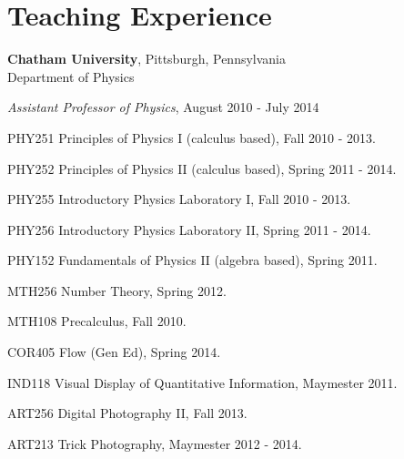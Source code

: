 \section{\sc Teaching Experience} %

{\bf Chatham University}, Pittsburgh, Pennsylvania\\
Department of Physics
\vspace{1mm}
\begin{list1}
\item[] {\em Assistant Professor of Physics}, August 2010 - July 2014
\vspace*{2mm}  
\begin{list2}
\item[\fcscore{4}] PHY251 Principles of Physics I (calculus based),  Fall 2010 - 2013.
\item[\fcscore{4}] PHY252 Principles of Physics II (calculus based),  Spring 2011 - 2014.
\item[\fcscore{4}] PHY255 Introductory Physics Laboratory I,  Fall 2010 - 2013.
\item[\fcscore{4}] PHY256 Introductory Physics Laboratory II,  Spring 2011 - 2014.
\item[\fcscore{1}] PHY152 Fundamentals of Physics II (algebra based),  Spring 2011.
\item[\fcscore{1}] MTH256 Number Theory, Spring 2012.
\item[\fcscore{1}] MTH108 Precalculus, Fall 2010.
\item[\fcscore{1}] COR405 Flow (Gen Ed), Spring 2014.
\item[\fcscore{1}] IND118 Visual Display of Quantitative Information, Maymester 2011.
\item[\fcscore{1}] ART256 Digital Photography II, Fall 2013.
\item[\fcscore{3}] ART213 Trick Photography, Maymester 2012 - 2014.
\end{list2}

\end{list1}



